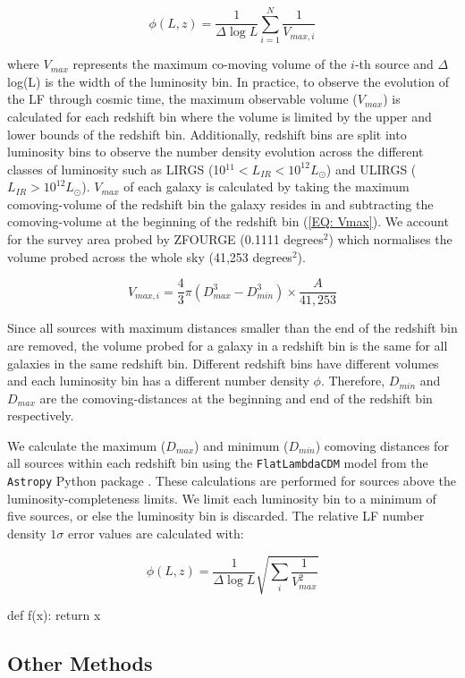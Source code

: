 \begin{equation} 
    \label{EQ: 1/Vmax}
    \phi(L,z) = \frac{1}{\Delta \log L}\sum_{i=1}^N \frac{1}{V_{max,i}}
\end{equation}

where $V_{max}$ represents the maximum co-moving volume of the $i$-th source and $\Delta$ log(L) is the width of the luminosity bin. In practice, to observe the evolution of the LF through cosmic time, the maximum observable volume ($V_{max}$) is calculated for each redshift bin where the volume is limited by the upper and lower bounds of the redshift bin. Additionally, redshift bins are split into luminosity bins to observe the number density evolution across the different classes of luminosity such as LIRGS (10$^{11} < L_{IR} < 10^{12} L_{\odot}$) and ULIRGS ($L_{IR} > 10^{12} L_{\odot}$). $V_{max}$ of each galaxy is calculated by taking the maximum comoving-volume of the redshift bin the galaxy resides in and subtracting the comoving-volume at the beginning of the redshift bin (\cref{EQ: Vmax}). We account for the survey area probed by ZFOURGE (0.1111 degrees$^2$) which normalises the volume probed across the whole sky (41,253 degrees$^2$). 

\begin{equation}
    \label{EQ: Vmax}
    V_{max,i} = \frac{4}{3} \pi \left(D_{max}^3 - D_{min}^3\right) \times \frac{A}{41,253}
\end{equation}

Since all sources with maximum distances smaller than the end of the redshift bin are removed, the volume probed for a galaxy in a redshift bin is the same for all galaxies in the same redshift bin. Different redshift bins have different volumes and each luminosity bin has a different number density $\phi$. Therefore, $D_{min}$ and $D_{max}$ are the comoving-distances at the beginning and end of the redshift bin respectively. 

We calculate the maximum ($D_{max}$) and minimum ($D_{min}$) comoving distances for all sources within each redshift bin using the \texttt{FlatLambdaCDM} model from the \texttt{Astropy} Python package \citep{astropy_collaboration_astropy_2022}. These calculations are performed for sources above the luminosity-completeness limits. We limit each luminosity bin to a minimum of five sources, or else the luminosity bin is discarded. The relative LF number density $1\sigma$ error values are calculated with:

\begin{equation} 
    \label{EQ: Vmax Error}
    \phi(L,z) = \frac{1}{\Delta \log L}\sqrt{\sum_i \frac{1}{V_{max}^2}}
\end{equation}


\begin{python}
    def f(x):
        return x
\end{python}

\subsection{Other Methods}